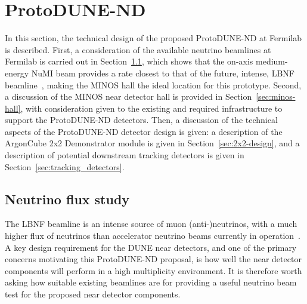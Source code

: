 \section{ProtoDUNE-ND}
\label{sec:protodune-nd}
In this section, the technical design of the proposed ProtoDUNE-ND at Fermilab is described. First, a consideration of the available neutrino beamlines at Fermilab is carried out in Section~\ref{sec:neutrino-flux}, which shows that the on-axis medium-energy NuMI beam provides a rate closest to that of the future, intense, LBNF beamline~\cite{DUNE3, dune_opt_flux}, making the MINOS hall the ideal location for this prototype. Second, a discussion of the MINOS near detector hall is provided in Section~\ref{sec:minos-hall}, with consideration given to the existing and required infrastructure to support the ProtoDUNE-ND detectors. Then, a discussion of the technical aspects of the ProtoDUNE-ND detector design is given: a description of the ArgonCube 2x2 Demonstrator module is given in Section~\ref{sec:2x2-design}, and a description of potential downstream tracking detectors is given in Section~\ref{sec:tracking_detectors}. 

\subsection{Neutrino flux study}
\label{sec:neutrino-flux}
The LBNF beamline is an intense source of muon (anti-)neutrinos, with a much higher flux of neutrinos than accelerator neutrino beams currently in operation~\cite{DUNE3,dune_opt_flux}. A key design requirement for the DUNE near detectors, and one of the primary concerns motivating this ProtoDUNE-ND proposal, is how well the near detector components will perform in a high multiplicity environment. It is therefore worth asking how suitable existing beamlines are for providing a useful neutrino beam test for the proposed near detector components.

